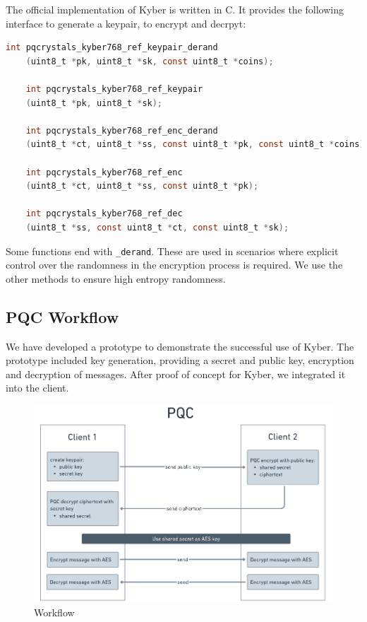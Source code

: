 The official implementation of Kyber is written in C. It provides the following interface to generate a keypair, to encrypt and decrpyt:
\begin{lstlisting}[language=C]
    int pqcrystals_kyber768_ref_keypair_derand
    (uint8_t *pk, uint8_t *sk, const uint8_t *coins);

    int pqcrystals_kyber768_ref_keypair
    (uint8_t *pk, uint8_t *sk);

    int pqcrystals_kyber768_ref_enc_derand
    (uint8_t *ct, uint8_t *ss, const uint8_t *pk, const uint8_t *coins);

    int pqcrystals_kyber768_ref_enc
    (uint8_t *ct, uint8_t *ss, const uint8_t *pk);

    int pqcrystals_kyber768_ref_dec
    (uint8_t *ss, const uint8_t *ct, const uint8_t *sk);
\end{lstlisting}

Some functions end with \texttt{\_derand}. These are used in scenarios where explicit control over the randomness in the encryption process is required. We use the other methods to ensure high entropy randomness.

\subsection {PQC Workflow}
\label{sec:pqcworkflow}

We have developed a prototype to demonstrate the successful use of Kyber. The prototype included key generation, providing a secret and public key, encryption and decryption of messages.  After proof of concept for Kyber, we integrated it into the client.\\

\begin{figure}[H]
	\centering
	\includegraphics[width=1\linewidth]{resources/PQC_Diagram.png}
	\caption{Workflow}
	\label{fig:pqcdiagram}
\end{figure}

